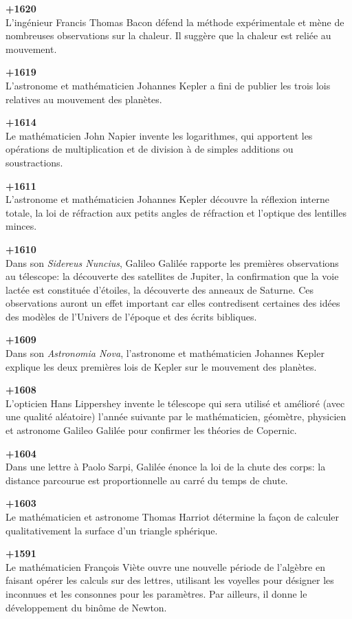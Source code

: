 \textbf{+1620}\\
L'ingénieur Francis Thomas Bacon défend la méthode expérimentale et mène de nombreuses observations sur la chaleur. Il suggère que la chaleur est reliée au mouvement.

\textbf{+1619}\\
L'astronome et mathématicien Johannes Kepler a fini de publier les trois lois relatives au mouvement des planètes.

\textbf{+1614}\\
Le mathématicien John Napier invente les logarithmes, qui apportent les opérations de multiplication et de division à de simples additions ou soustractions.

\textbf{+1611}\\
L'astronome et mathématicien Johannes Kepler découvre la réflexion interne totale, la loi de réfraction aux petits angles de réfraction et l'optique des lentilles minces.

\textbf{+1610}\\ 
Dans son \textit{Sidereus Nuncius}, Galileo Galilée rapporte les premières observations au télescope: la découverte des satellites de Jupiter, la confirmation que la voie lactée est constituée d'étoiles, la découverte des anneaux de Saturne. Ces observations auront un effet important car elles contredisent certaines des idées des modèles de l'Univers de l'époque et des écrits bibliques.

\textbf{+1609}\\
Dans son \textit{Astronomia Nova}, l'astronome et mathématicien Johannes Kepler explique les deux premières lois de Kepler sur le mouvement des planètes.

\textbf{+1608}\\
L'opticien Hans Lippershey invente le télescope qui sera utilisé et amélioré (avec une qualité aléatoire) l'année suivante par le mathématicien, géomètre, physicien et astronome Galileo Galilée pour confirmer les théories de Copernic.

\textbf{+1604}\\
Dans une lettre à Paolo Sarpi, Galilée énonce la loi de la chute des corps: la distance parcourue est proportionnelle au carré du temps de chute.

\textbf{+1603}\\
Le mathématicien et astronome Thomas Harriot détermine la façon de calculer qualitativement la surface d'un triangle sphérique.

\textbf{+1591}\\
Le mathématicien François Viète ouvre une nouvelle période de l'algèbre en faisant opérer les calculs sur des lettres, utilisant les voyelles pour désigner les inconnues et les consonnes pour les paramètres. Par ailleurs, il donne le développement du binôme de Newton.

